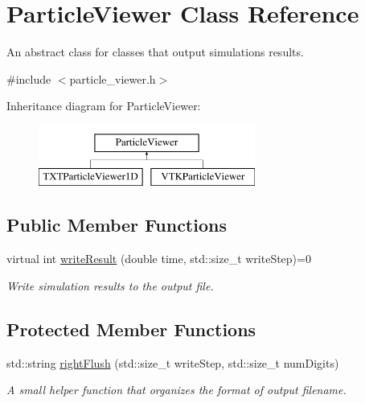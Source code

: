 \hypertarget{classParticleViewer}{\section{Particle\-Viewer Class Reference}
\label{classParticleViewer}
}


An abstract class for classes that output simulations results.  




{\ttfamily \#include $<$particle\-\_\-viewer.\-h$>$}

Inheritance diagram for Particle\-Viewer\-:\begin{figure}[H]
\begin{center}
\leavevmode
\includegraphics[height=2.000000cm]{classParticleViewer}
\end{center}
\end{figure}
\subsection*{Public Member Functions}
\begin{DoxyCompactItemize}
\item 
virtual int \hyperlink{classParticleViewer_ab30b43a09b1412934e48bcf4bdac26a5}{write\-Result} (double time, std\-::size\-\_\-t write\-Step)=0
\begin{DoxyCompactList}\small\item\em Write simulation results to the output file. \end{DoxyCompactList}\end{DoxyCompactItemize}
\subsection*{Protected Member Functions}
\begin{DoxyCompactItemize}
\item 
std\-::string \hyperlink{classParticleViewer_ab323188b9272afa2ad133de69b5fedd2}{right\-Flush} (std\-::size\-\_\-t write\-Step, std\-::size\-\_\-t num\-Digits)
\begin{DoxyCompactList}\small\item\em A small helper function that organizes the format of output filename. \end{DoxyCompactList}\end{DoxyCompactItemize}
